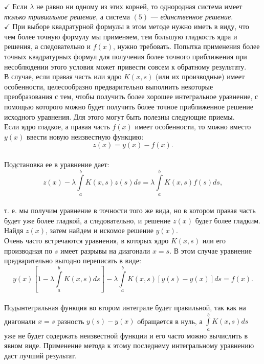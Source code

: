\documentclass[12pt]{article}
\begin{document}
$ \checkmark $ Если $ \lambda $ не равно ни одному из этих корней, то однородная система имеет \textit{только тривиальное решение}, а система $ (5) $ — \textit{единственное решение}. \\

$ \checkmark $ При выборе квадратурной формулы в этом методе нужно иметь в виду, что чем более точную формулу мы применяем, тем большую гладкость ядра и решения, а следовательно и $ f(x) $, нужно требовать. Попытка применения более точных квадратурных формул для получения более точного приближения при несоблюдении этого условия может привести совсем к обратному результату. \\

В случае, если правая часть или ядро $ K(x,s) $ (или их производные) имеет особенности, целесообразно предварительно выполнить некоторые преобразования с тем, чтобы получить более хорошее интегральное уравнение, с помощью которого можно будет получить более точное приближенное решение исходного уравнения. Для этого могут быть полезны следующие приемы.\\

Если ядро гладкое, а правая часть $ f(x) $ имеет особенности, то можно вместо $ y(x) $ ввести новую неизвестную функцию:\\
$$ z(x) = y(x) - f(x) .$$\\
Подстановка ее в уравнение дает:\\
$$ z(x) - \lambda\int\limits_a^b K(x,s)z(s)ds = \lambda\int\limits_a^b K(x,s)f(s) ds ,$$ \\
т. е. мы получим уравнение в точности того же вида, но в котором правая часть будет уже более гладкой, а следовательно, и решение $ z(x) $ будет более гладким. Найдя $ z(x) $, затем найдем и искомое решение $ y(x) $. \\

Очень часто встречаются уравнения, в которых ядро $ K(x,s) $ или его производная по $ s $ имеет разрывы на диагонали $ x = s $. В этом случае уравнение предварительно выгодно переписать в виде:\\
$$ y(x)\left[ 1- \lambda\int\limits_a^b K(x,s) ds \right] - \lambda\int\limits_a^b K(x,s)[y(s) - y(x)]ds = f(x) .  $$\\
Подынтегральная функция во втором интеграле будет правильной, так как на диагонали $ x = s $ разность $ y(s) - y(x) $ обращается в нуль, а $ \int\limits_a^b K(x,s) ds $ уже не будет содержать неизвестной функции и его часто можно вычислить в явном виде. Применение метода к этому последнему интегральному уравнению даст лучший результат. \\
\end{document}

